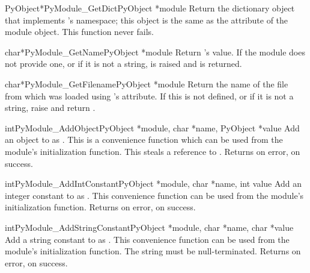 \documentclass{manual}
\begin{document}
\begin{cfuncdesc}{PyObject*}{PyModule_GetDict}{PyObject *module}
Return the dictionary object that implements 's namespace; 
this object is the same as the  attribute of the
module object.  This function never fails.
\end{cfuncdesc}

\begin{cfuncdesc}{char*}{PyModule_GetName}{PyObject *module}
Return 's  value.  If the module does not 
provide one, or if it is not a string,  is
raised and \NULL{} is returned.
\end{cfuncdesc}

\begin{cfuncdesc}{char*}{PyModule_GetFilename}{PyObject *module}
Return the name of the file from which  was loaded using
's  attribute.  If this is not defined,
or if it is not a string, raise  and return
\NULL.
\end{cfuncdesc}

\begin{cfuncdesc}{int}{PyModule_AddObject}{PyObject *module,
                                           char *name, PyObject *value}
Add an object to  as .  This is a convenience
function which can be used from the module's initialization function.
This steals a reference to .  Returns  on error,
 on success.
\end{cfuncdesc}

\begin{cfuncdesc}{int}{PyModule_AddIntConstant}{PyObject *module,
                                                char *name, int value}
Add an integer constant to  as .  This convenience
function can be used from the module's initialization function.
Returns  on error,  on success.
\end{cfuncdesc}

\begin{cfuncdesc}{int}{PyModule_AddStringConstant}{PyObject *module,
                                                   char *name, char *value}
Add a string constant to  as .  This convenience
function can be used from the module's initialization function.  The
string  must be null-terminated.  Returns  on
error,  on success.
\end{cfuncdesc}
\end{document}
